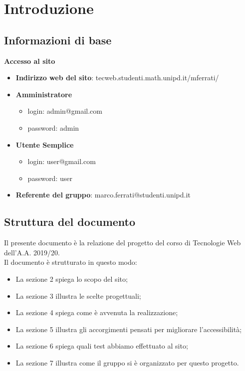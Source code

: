 \documentclass[1_relazione.tex]{subfiles}
\begin{document}
\section{Introduzione}

\subsection{Informazioni di base}
\textbf{Accesso al sito}

\begin{itemize}
\item \textbf{Indirizzo web del sito}: tecweb.studenti.math.unipd.it/mferrati/
\item \textbf{Amministratore}
	\begin{itemize}
	\item login: admin@gmail.com
	\item password: admin
	\end{itemize}
\item \textbf{Utente Semplice}
	\begin{itemize}
	\item login: user@gmail.com
	\item password: user
	\end{itemize}
\item \textbf{Referente del gruppo}: marco.ferrati@studenti.unipd.it 
\end{itemize}

\subsection{Struttura del documento}
Il presente documento \`{e} la relazione del progetto del corso di Tecnologie Web dell'A.A. 2019/20. \\Il documento \`{e} strutturato in questo modo:
\begin{itemize}
	\item La sezione 2 spiega lo scopo del sito;
	\item La sezione 3 illustra le scelte progettuali;
	\item La sezione 4 spiega come \`{e} avvenuta la realizzazione;
	\item La sezione 5 illustra gli accorgimenti pensati per migliorare l'accessibilit\`{a};
	\item La sezione 6 spiega quali test abbiamo effettuato al sito;
	\item La sezione 7 illustra come il gruppo si \`{e} organizzato per questo progetto.
\end{itemize}
\end{document}
